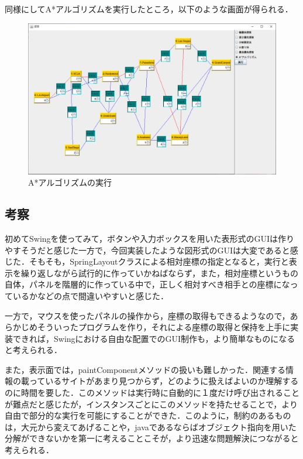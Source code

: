 \documentclass[12pt]{jarticle}
\begin{document}
同様にしてA*アルゴリズムを実行したところ，以下のような画面が得られる．

\begin{figure}[!hbt]
  	\begin{center}
  		\includegraphics[scale=0.50]{scs3.png}
	\end{center}
  	\caption{A*アルゴリズムの実行}
\end{figure}
\clearpage

\subsection{考察}
初めてSwingを使ってみて，ボタンや入力ボックスを用いた表形式のGUIは作りやすそうだと感じた一方で，今回実装したような図形式のGUIは大変であると感じた．そもそも，SpringLayoutクラスによる相対座標の指定となると，実行と表示を繰り返しながら試行的に作っていかねばならず，また，相対座標というもの自体，パネルを階層的に作っている中で，正しく相対すべき相手との座標になっているかなどの点で間違いやすいと感じた．

一方で，マウスを使ったパネルの操作から，座標の取得もできるようなので，あらかじめそういったプログラムを作り，それによる座標の取得と保持を上手に実装できれば，Swingにおける自由な配置でのGUI制作も，より簡単なものになると考えられる．

また，表示面では，paintComponentメソッドの扱いも難しかった．関連する情報の載っているサイトがあまり見つからず，どのように扱えばよいのか理解するのに時間を要した．このメソッドは実行時に自動的に１度だけ呼び出されることが難点だと感じたが，インスタンスごとにこのメソッドを持たせることで，より自由で部分的な実行を可能にすることができた．このように，制約のあるものは，大元から変えてあげることや，javaであるならばオブジェクト指向を用いた分解ができないかを第一に考えることこそが，より迅速な問題解決につながると考えられる．
\end{document}
